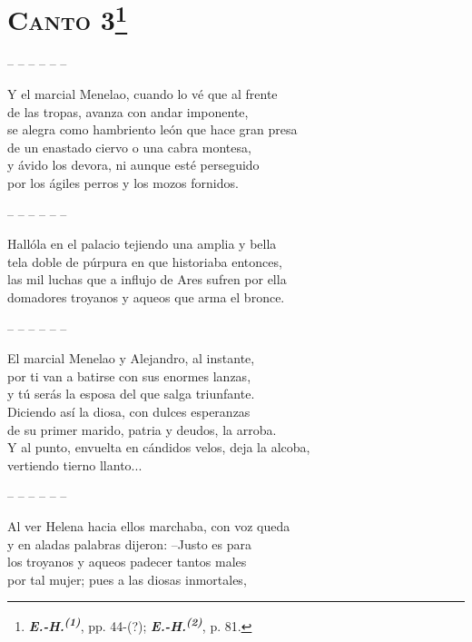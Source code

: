 \documentclass[11pt,twoside]{article}
\newcommand{\ehuno}{\emph{\textbf{E.-H.\textsuperscript{(1)}}}}
\newcommand{\ehdos}{\emph{\textbf{E.-H.\textsuperscript{(2)}}}}
\begin{document}
\section*{\centering\textbf{\textsc{Canto} 3}\footnote{\ehuno, pp. 44-(?); \ehdos, p. 81.}}
%
\noindent-- -- -- -- -- --\par
%
\beginnumbering
\pstart
{}
Y el marcial Menelao, cuando lo vé que al frente\\
de las tropas, avanza con andar imponente,\\
se alegra como hambriento león que hace gran presa\\
de un enastado ciervo o una cabra montesa,\\
y ávido los devora, ni aunque esté perseguido\\
por los ágiles perros y los mozos fornidos.\par
\pend
%
\noindent-- -- -- -- -- --\par
%
\pstart
{}
Hallóla en el palacio tejiendo una amplia y bella\\
tela doble de púrpura en que historiaba entonces,\\
las mil luchas que a influjo de Ares sufren por ella\\
domadores troyanos y aqueos que arma el bronce.\par
\pend
%
\noindent-- -- -- -- -- --\par
%
\pstart
{}
El marcial Menelao y Alejandro, al instante,\\
por ti van a batirse con sus enormes lanzas,\\
y tú serás la esposa del que salga triunfante.\\
Diciendo así la diosa, con dulces esperanzas\\
de su primer marido, patria y deudos, la arroba.\\
Y al punto, envuelta en cándidos velos, deja la alcoba,\\
vertiendo tierno llanto...\par
\pend
%
\noindent-- -- -- -- -- --\par
%
\pstart
{}
Al ver Helena hacia ellos marchaba, con voz queda\\
y en aladas palabras dijeron: --Justo es para\\
los troyanos y aqueos padecer tantos males\\
por tal mujer; pues a las diosas inmortales,\\
\end{document}
